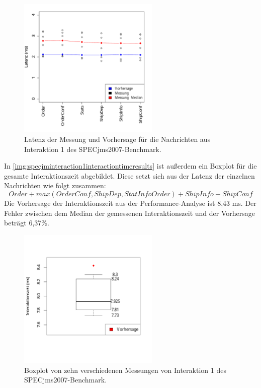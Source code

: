 \begin{figure}
\center
  \includegraphics[width=0.6\textwidth]{images/evaluation/specjmsresults/interaktion1.pdf}
  \caption{Latenz der Messung und Vorhersage für die Nachrichten aus Interaktion 1 des SPECjms2007-Benchmark.}
  \label{img:specjminteraction1results}
\end{figure}

In \autoref{img:specjminteraction1interactiontimeresults} ist außerdem ein Boxplot für die gesamte Interaktionszeit abgebildet. Diese setzt sich aus der Latenz der einzelnen Nachrichten wie folgt zusammen: \[\mathit{Order} + max(\mathit{OrderConf}, \mathit{ShipDep}, \mathit{StatInfoOrder}) + \mathit{ShipInfo} + \mathit{ShipConf}\] 
Die Vorhersage der Interaktionszeit aus der Performance-Analyse ist 8,43 ms. Der Fehler zwischen dem Median der gemessenen Interaktionszeit und der Vorhersage beträgt 6,37\%.

\begin{figure}
\center
  \includegraphics[width=0.6\textwidth]{images/evaluation/specjmsresults/interaktion1InteractionTime.pdf}
  \caption{Boxplot von zehn verschiedenen Messungen von Interaktion 1 des SPECjms2007-Benchmark.}
  \label{img:specjminteraction1interactiontimeresults}
\end{figure}

